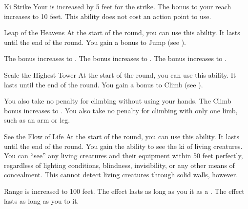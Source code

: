 {\begin{ability}{Ki Strike}
                \rankline
                 Your  is increased by 5 feet for the strike.
                 The bonus to your reach increases to 10 feet. 
                 This ability does not cost an action point to use.
            \end{ability}

            \begin{ability}{Leap of the Heavens}
                At the start of the round, you can use this ability.
                It lasts until the end of the round.
                You gain a  bonus to Jump (see ).

                \rankline
                 The bonus increases to .
                 The bonus increases to .
                 The bonus increases to .
            \end{ability}

            \begin{ability}{Scale the Highest Tower}
                At the start of the round, you can use this ability.
                It lasts until the end of the round.
                You gain a  bonus to Climb (see ).

                \rankline
                 You also take no penalty for climbing without using your hands.
                 The Climb bonus increases to .
                 You also take no penalty for climbing with only one limb, such as an arm or leg.
            \end{ability}

            \begin{ability}{See the Flow of Life}
                At the start of the round, you can use this ability.
                It lasts until the end of the round.
                You gain the ability to see the ki of living creatures.
                You can ``see'' any living creatures and their equipment within 50 feet perfectly, regardless of lighting conditions, blindness, invisibility, or any other means of concealment.
                This cannot detect living creatures through solid walls, however.

                \rankline
                 Range is increased to 100 feet.
                 The effect lasts as long as you  it as a .
                 The effect lasts as long as you  to it.
            \end{ability}

}
